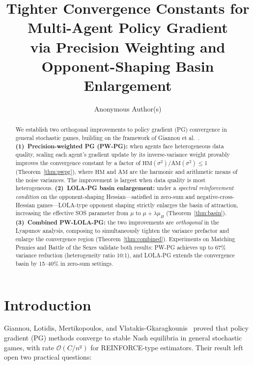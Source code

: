 \documentclass[10pt,letterpaper]{article}
\title{\textbf{Tighter Convergence Constants for Multi-Agent Policy Gradient\\
  via Precision Weighting and Opponent-Shaping Basin Enlargement}}
\author{
  Anonymous Author(s)
}
\date{}
\newcommand{\HM}{\mathrm{HM}}
\newcommand{\AM}{\mathrm{AM}}
\begin{document}
\maketitle
\thispagestyle{fancy}

\begin{abstract}
We establish two orthogonal improvements to policy gradient (PG)
convergence in general stochastic games, building on the framework of
Giannou et al.~\cite{giannou2022}.
\textbf{(1)~Precision-weighted PG (PW-PG):} when agents face
heterogeneous data quality, scaling each agent's gradient update by
its inverse-variance weight provably improves the convergence constant
by a factor of $\HM(\sigma^2)/\AM(\sigma^2) \leq 1$ (Theorem~\ref{thm:pwpg}),
where $\HM$ and $\AM$ are the harmonic and arithmetic means of the
noise variances. The improvement is largest when data quality is most
heterogeneous.
\textbf{(2)~LOLA-PG basin enlargement:} under a
\emph{spectral reinforcement condition} on the opponent-shaping
Hessian---satisfied in zero-sum and negative-cross-Hessian
games---LOLA-type opponent shaping strictly enlarges the basin of
attraction, increasing the effective SOS parameter from $\mu$ to
$\mu + \lambda\mu_H$ (Theorem~\ref{thm:basin}).
\textbf{(3)~Combined PW-LOLA-PG:} the two improvements are
\emph{orthogonal} in the Lyapunov analysis, composing to simultaneously
tighten the variance prefactor and enlarge the convergence region
(Theorem~\ref{thm:combined}). Experiments on Matching Pennies and
Battle of the Sexes validate both results: PW-PG achieves up to 67\%
variance reduction (heterogeneity ratio 10:1), and LOLA-PG extends
the convergence basin by 15--40\% in zero-sum settings.
\end{abstract}

\section{Introduction}

Giannou, Lotidis, Mertikopoulos, and Vlatakis-Gkaragkounis~\cite{giannou2022}
proved that policy gradient (PG) methods converge to stable Nash
equilibria in general stochastic games, with rate
$\mathcal{O}(C/n^q)$ for REINFORCE-type estimators. Their result left
open two practical questions:
\end{document}
